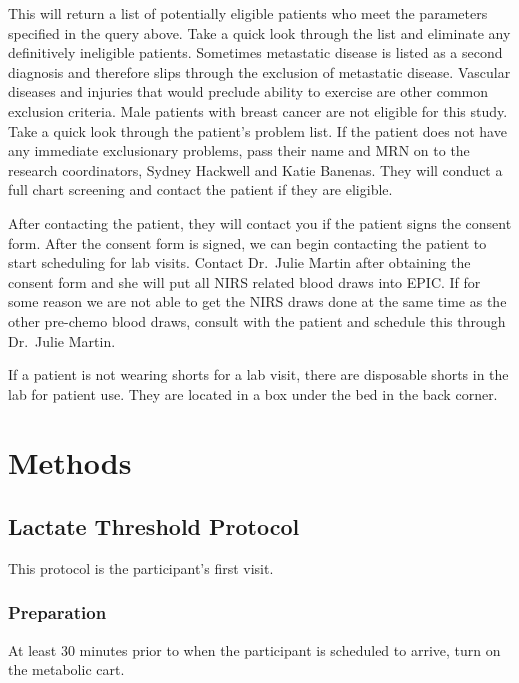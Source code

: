 \documentclass[
]{book}
\begin{document}
This will return a list of potentially eligible patients who meet the parameters specified in the query above. Take a quick look through the list and eliminate any definitively ineligible patients. Sometimes metastatic disease is listed as a second diagnosis and therefore slips through the exclusion of metastatic disease. Vascular diseases and injuries that would preclude ability to exercise are other common exclusion criteria. Male patients with breast cancer are not eligible for this study. Take a quick look through the patient's problem list. If the patient does not have any immediate exclusionary problems, pass their name and MRN on to the research coordinators, Sydney Hackwell and Katie Banenas. They will conduct a full chart screening and contact the patient if they are eligible.

After contacting the patient, they will contact you if the patient signs the consent form. After the consent form is signed, we can begin contacting the patient to start scheduling for lab visits. Contact Dr.~Julie Martin after obtaining the consent form and she will put all NIRS related blood draws into EPIC. If for some reason we are not able to get the NIRS draws done at the same time as the other pre-chemo blood draws, consult with the patient and schedule this through Dr.~Julie Martin.

If a patient is not wearing shorts for a lab visit, there are disposable shorts in the lab for patient use. They are located in a box under the bed in the back corner.

\hypertarget{Methods}{%
\chapter{Methods}\label{Methods}}

\hypertarget{Methods-LT}{%
\section{Lactate Threshold Protocol}\label{Methods-LT}}

This protocol is the participant's first visit.

\hypertarget{Methods-LT-prep}{%
\subsection{Preparation}\label{Methods-LT-prep}}

At least 30 minutes prior to when the participant is scheduled to arrive, turn on the metabolic cart.
\end{document}
